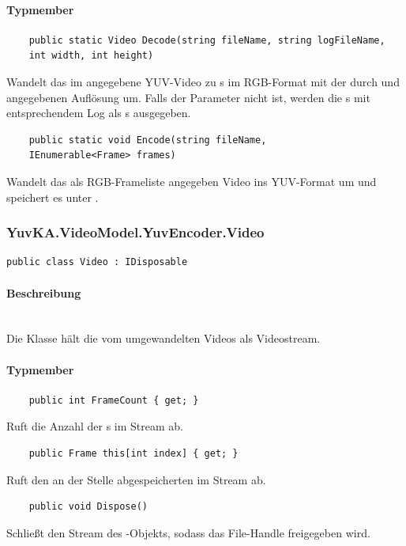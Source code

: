 \paragraph{Typmember}
\begin{itemize}

	\begin{verbatim}
	public static Video Decode(string fileName, string logFileName,
    int width, int height)
	\end{verbatim}
	Wandelt das im  angegebene YUV-Video zu s im RGB-Format mit der durch  und  angegebenen Auflösung um. Falls der Parameter  nicht  ist, werden die s mit entsprechendem Log als s ausgegeben.

	\begin{verbatim}
	public static void Encode(string fileName,
    IEnumerable<Frame> frames)
	\end{verbatim}
	Wandelt das als RGB-Frameliste angegeben Video ins YUV-Format um und speichert es unter . 

\end{itemize}

\subsubsection*{YuvKA.VideoModel.YuvEncoder.Video}

\begin{verbatim}
public class Video : IDisposable
\end{verbatim}

\paragraph{Beschreibung}~\\
Die Klasse  hält die vom  umgewandelten Videos als Videostream.

\paragraph{Typmember}
\begin{itemize}

	\begin{verbatim}
	public int FrameCount { get; }
	\end{verbatim}
	Ruft die Anzahl der s im Stream ab.

	\begin{verbatim}
	public Frame this[int index] { get; }
	\end{verbatim}
	Ruft den an der Stelle  abgespeicherten  im Stream ab.

	\begin{verbatim}
	public void Dispose()
	\end{verbatim}
	Schließt den Stream des -Objekts, sodass das File-Handle freigegeben wird.

\end{itemize}

